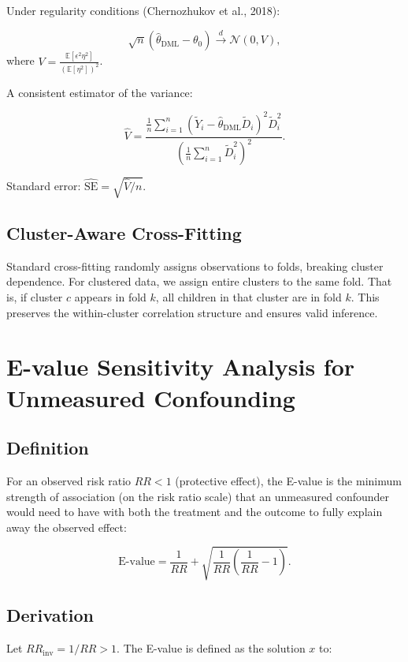 \documentclass[12pt]{article}
\begin{document}
	Under regularity conditions (Chernozhukov et al., 2018):
	
	\[
	\sqrt{n} (\hat{\theta}_{\text{DML}} - \theta_0) \xrightarrow{d} \mathcal{N}(0, V),
	\]
	where $V = \frac{\mathbb{E}[\epsilon^2 \eta^2]}{(\mathbb{E}[\eta^2])^2}$.
	
	A consistent estimator of the variance:
	
	\[
	\hat{V} = \frac{\frac{1}{n} \sum_{i=1}^n (\tilde{Y}_i - \hat{\theta}_{\text{DML}} \tilde{D}_i)^2 \tilde{D}_i^2}{\left( \frac{1}{n} \sum_{i=1}^n \tilde{D}_i^2 \right)^2}.
	\]
	
	Standard error: $\widehat{\text{SE}} = \sqrt{\hat{V} / n}$.
	
	\subsection{Cluster-Aware Cross-Fitting}
	
	Standard cross-fitting randomly assigns observations to folds, breaking cluster dependence. For clustered data, we assign entire clusters to the same fold. That is, if cluster $c$ appears in fold $k$, all children in that cluster are in fold $k$. This preserves the within-cluster correlation structure and ensures valid inference.
	
	\section{E-value Sensitivity Analysis for Unmeasured Confounding}
	
	\subsection{Definition}
	
	For an observed risk ratio $RR < 1$ (protective effect), the E-value is the minimum strength of association (on the risk ratio scale) that an unmeasured confounder would need to have with both the treatment and the outcome to fully explain away the observed effect:
	
	\[
	\text{E-value} = \frac{1}{RR} + \sqrt{ \frac{1}{RR} \left( \frac{1}{RR} - 1 \right) }.
	\]
	
	\subsection{Derivation}
	
	Let $RR_{\text{inv}} = 1/RR > 1$. The E-value is defined as the solution $x$ to:
	
\end{document}
